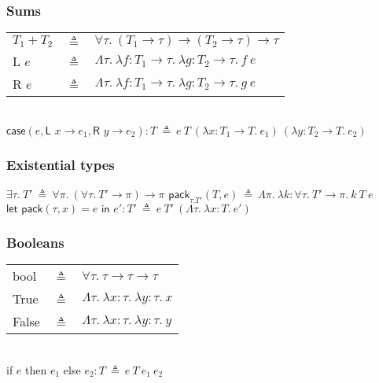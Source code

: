 \documentclass{article}
\begin{document}
\subsubsection*{Sums}

\hspace{-1em}
\begin{tabular}{lcl}
$T_1+T_2$ & \hspace{-0.5em}$\triangleq$ & \hspace{-0.5em}$\forall\tau.\ (T_1\to\tau)\to(T_2\to\tau)\to\tau$\\[0.5em]
\textsf{L }$e$ & \hspace{-0.5em}$\triangleq$ & \hspace{-0.5em}$\Lambda\tau.\ \lambda f:T_1\to\tau.\ \lambda g:T_2\to\tau.\ f\ e$\\[0.5em]
\textsf{R }$e$ & \hspace{-0.5em}$\triangleq$ & \hspace{-0.5em}$\Lambda\tau.\ \lambda f:T_1\to\tau.\ \lambda g:T_2\to\tau.\ g\ e$\\[0.5em]
\end{tabular}\\
$\textsf{case}(e,\textsf{L }x\to e_1,\textsf{R }y\to e_2):T\ \triangleq\ e\ T\ (\lambda x:T_1\to T.\ e_1)\ (\lambda y:T_2\to T.\ e_2)$

\subsubsection*{Existential types}

$\exists\tau.\ T'\ \triangleq\ \forall\pi.\ (\forall\tau.\ T'\to\pi)\to\pi$\medbreak
\noindent
$\textsf{pack}_{\tau.T'}(T,e)\ \triangleq\ \Lambda\pi.\ \lambda k:\forall\tau.\ T'\to\pi.\ k\ T\ e$\medbreak
\noindent
$\textsf{let pack}(\tau,x)=e\textsf{ in }e':T'\ \triangleq\ e\ T'\ (\Lambda\tau.\ \lambda x:T.\ e')$

\subsubsection*{Booleans}

\hspace{-1em}
\begin{tabular}{lcl}
\textsf{bool} & \hspace{-0.5em}$\triangleq$ & \hspace{-0.5em}$\forall\tau.\ \tau\to\tau\to\tau$\\[0.5em]
\textsf{True} & \hspace{-0.5em}$\triangleq$ & \hspace{-0.5em}$\Lambda\tau.\ \lambda x:\tau.\ \lambda y:\tau.\ x$\\[0.5em]
\textsf{False} & \hspace{-0.5em}$\triangleq$ & \hspace{-0.5em}$\Lambda\tau.\ \lambda x:\tau.\ \lambda y:\tau.\ y$\\[0.5em]
\end{tabular}\\
\textsf{if }$e$\textsf{ then }$e_1$\textsf{ else }$e_2:T\ \triangleq\ e\ T\ e_1\ e_2$
\end{document}
